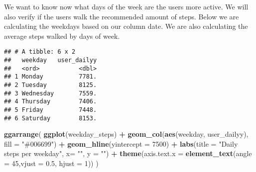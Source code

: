 \documentclass[
]{article}
\newenvironment{Shaded}{\begin{snugshade}}{\end{snugshade}}
\newcommand{\AttributeTok}[1]{\textcolor[rgb]{0.13,0.29,0.53}{#1}}
\newcommand{\DecValTok}[1]{\textcolor[rgb]{0.00,0.00,0.81}{#1}}
\newcommand{\FloatTok}[1]{\textcolor[rgb]{0.00,0.00,0.81}{#1}}
\newcommand{\FunctionTok}[1]{\textcolor[rgb]{0.13,0.29,0.53}{\textbf{#1}}}
\newcommand{\NormalTok}[1]{#1}
\newcommand{\OtherTok}[1]{\textcolor[rgb]{0.56,0.35,0.01}{#1}}
\newcommand{\SpecialCharTok}[1]{\textcolor[rgb]{0.81,0.36,0.00}{\textbf{#1}}}
\newcommand{\StringTok}[1]{\textcolor[rgb]{0.31,0.60,0.02}{#1}}
\begin{document}
We want to know now what days of the week are the users more active. We
will also verify if the users walk the recommended amount of steps.
Below we are calculating the weekdays based on our column date. We are
also calculating the average steps walked by days of week.

\begin{Shaded}
\end{Shaded}

\begin{verbatim}
## # A tibble: 6 x 2
##   weekday   user_dailyy
##   <ord>           <dbl>
## 1 Monday          7781.
## 2 Tuesday         8125.
## 3 Wednesday       7559.
## 4 Thursday        7406.
## 5 Friday          7448.
## 6 Saturday        8153.
\end{verbatim}

\begin{Shaded}
\begin{Highlighting}[]
\FunctionTok{ggarrange}\NormalTok{(}
    \FunctionTok{ggplot}\NormalTok{(weekday\_steps) }\SpecialCharTok{+}
      \FunctionTok{geom\_col}\NormalTok{(}\FunctionTok{aes}\NormalTok{(weekday, user\_dailyy), }\AttributeTok{fill =} \StringTok{"\#006699"}\NormalTok{) }\SpecialCharTok{+}
      \FunctionTok{geom\_hline}\NormalTok{(}\AttributeTok{yintercept =} \DecValTok{7500}\NormalTok{) }\SpecialCharTok{+}
      \FunctionTok{labs}\NormalTok{(}\AttributeTok{title =} \StringTok{"Daily steps per weekday"}\NormalTok{, }\AttributeTok{x=} \StringTok{""}\NormalTok{, }\AttributeTok{y =} \StringTok{""}\NormalTok{) }\SpecialCharTok{+}
      \FunctionTok{theme}\NormalTok{(}\AttributeTok{axis.text.x =} \FunctionTok{element\_text}\NormalTok{(}\AttributeTok{angle =} \DecValTok{45}\NormalTok{,}\AttributeTok{vjust =} \FloatTok{0.5}\NormalTok{, }\AttributeTok{hjust =} \DecValTok{1}\NormalTok{))}
\NormalTok{)}
\end{Highlighting}
\end{Shaded}
\end{document}
